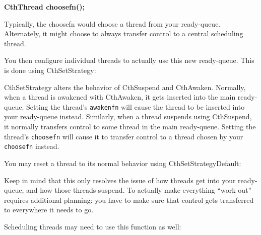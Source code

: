 {\bf CthThread choosefn();}

Typically, the choosefn would choose a thread from your ready-queue.
Alternately, it might choose to always transfer control to a central
scheduling thread.

You then configure individual threads to actually use this new
ready-queue.  This is done using CthSetStrategy:


CthSetStrategy alters the behavior of CthSuspend and CthAwaken.
Normally, when a thread is awakened with CthAwaken, it gets inserted
into the main ready-queue.  Setting the thread's {\tt awakenfn} will
cause the thread to be inserted into your ready-queue instead.
Similarly, when a thread suspends using CthSuspend, it normally
transfers control to some thread in the main ready-queue.  Setting the
thread's {\tt choosefn} will cause it to transfer control to a thread
chosen by your {\tt choosefn} instead.

You may reset a thread to its normal behavior using CthSetStrategyDefault:


Keep in mind that this only resolves the issue of how threads get into
your ready-queue, and how those threads suspend.  To actually make
everything ``work out'' requires additional planning: you have to make
sure that control gets transferred to everywhere it needs to go.

Scheduling threads may need to use this function as well:


